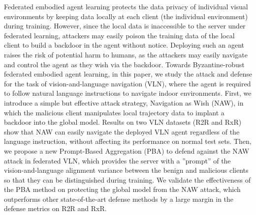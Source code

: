 Federated embodied agent learning protects the data privacy of individual visual environments by keeping data locally at each client (the individual environment) during training. However, since the local data is inaccessible to the server under federated learning, attackers may easily poison the training data of the local client to build a backdoor in the agent without notice. Deploying such an agent raises the risk of potential harm to humans, as the attackers may easily navigate and control the agent as they wish via the backdoor. Towards Byzantine-robust federated embodied agent learning, in this paper, we study the attack and defense for the task of vision-and-language navigation (VLN), where the agent is required to follow natural language instructions to navigate indoor environments. First, we introduce a simple but effective attack strategy, Navigation as Wish (NAW), in which the malicious client manipulates local trajectory data to implant a backdoor into the global model. Results on two VLN datasets (R2R and RxR) show that NAW can easily navigate the deployed VLN agent regardless of the language instruction, without affecting its performance on normal test sets. Then, we propose a new Prompt-Based Aggregation (PBA) to defend against the NAW attack in federated VLN, which provides the server with a ''prompt'' of the vision-and-language alignment variance between the benign and malicious clients so that they can be distinguished during training. We validate the effectiveness of the PBA method on protecting the global model from the NAW attack, which outperforms other state-of-the-art defense methods by a large margin in the defense metrics on R2R and RxR.